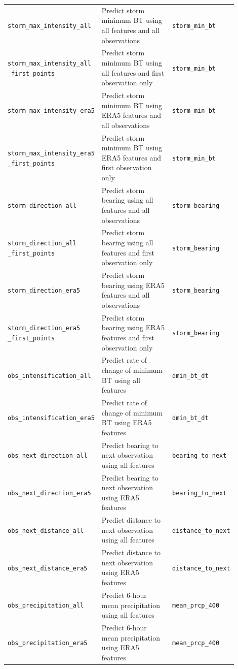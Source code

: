 {\begin{longtable}{>{\raggedright\arraybackslash}p{0.27\linewidth} p{0.43\linewidth} >{\raggedright\arraybackslash}p{0.20\linewidth}}
    \texttt{storm\_max\_intensity\_all} & Predict storm minimum BT using all features and all observations & \texttt{storm\_min\_bt} \\
    \texttt{storm\_max\_intensity\_all \_first\_points} & Predict storm minimum BT using all features and first observation only & \texttt{storm\_min\_bt} \\
    \texttt{storm\_max\_intensity\_era5} & Predict storm minimum BT using ERA5 features and all observations & \texttt{storm\_min\_bt} \\
    \texttt{storm\_max\_intensity\_era5 \_first\_points} & Predict storm minimum BT using ERA5 features and first observation only & \texttt{storm\_min\_bt} \\
    \texttt{storm\_direction\_all} & Predict storm bearing using all features and all observations & \texttt{storm\_bearing} \\
    \texttt{storm\_direction\_all \_first\_points} & Predict storm bearing using all features and first observation only & \texttt{storm\_bearing} \\
    \texttt{storm\_direction\_era5} & Predict storm bearing using ERA5 features and all observations & \texttt{storm\_bearing} \\
    \texttt{storm\_direction\_era5 \_first\_points} & Predict storm bearing using ERA5 features and first observation only & \texttt{storm\_bearing} \\
    \texttt{obs\_intensification\_all} & Predict rate of change of minimum BT using all features & \texttt{dmin\_bt\_dt} \\
    \texttt{obs\_intensification\_era5} & Predict rate of change of minimum BT using ERA5 features & \texttt{dmin\_bt\_dt} \\
    \texttt{obs\_next\_direction\_all} & Predict bearing to next observation using all features & \texttt{bearing\_to\_next} \\
    \texttt{obs\_next\_direction\_era5} & Predict bearing to next observation using ERA5 features & \texttt{bearing\_to\_next} \\
    \texttt{obs\_next\_distance\_all} & Predict distance to next observation using all features & \texttt{distance\_to\_next} \\
    \texttt{obs\_next\_distance\_era5} & Predict distance to next observation using ERA5 features & \texttt{distance\_to\_next} \\
    \texttt{obs\_precipitation\_all} & Predict 6-hour mean precipitation using all features & \texttt{mean\_prcp\_400} \\
    \texttt{obs\_precipitation\_era5} & Predict 6-hour mean precipitation using ERA5 features & \texttt{mean\_prcp\_400} \\
\end{longtable}
}